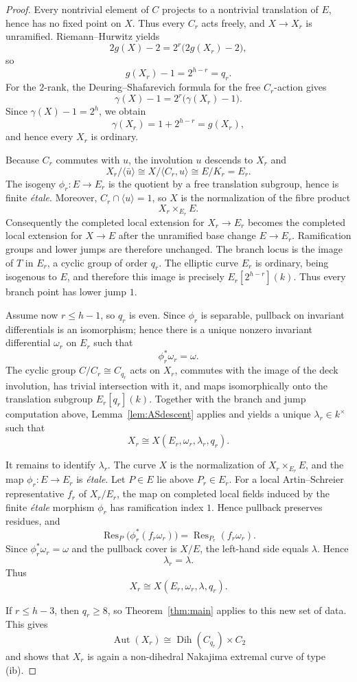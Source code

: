 \documentclass[11pt]{article}
\theoremstyle{remark}
\newcommand{\Aut}{\operatorname{Aut}}
\newcommand{\Res}{\operatorname{Res}}
\newcommand{\Dih}{\operatorname{Dih}}
\begin{document}
\begin{proof}
Every nontrivial element of $C$ projects to a nontrivial translation of
$E$, hence has no fixed point on $X$.  Thus every $C_r$ acts freely, and
$X\to X_r$ is unramified.  Riemann--Hurwitz yields
\[
 2g(X)-2=2^r\bigl(2g(X_r)-2\bigr),
\]
so
\[
 g(X_r)-1=2^{h-r}=q_r.
\]
For the $2$-rank, the Deuring--Shafarevich formula for the free
$C_r$-action gives
\[
 \gamma(X)-1=2^r\bigl(\gamma(X_r)-1\bigr).
\]
Since $\gamma(X)-1=2^h$, we obtain
\[
 \gamma(X_r)=1+2^{h-r}=g(X_r),
\]
and hence every $X_r$ is ordinary.

Because $C_r$ commutes with $u$, the involution $u$ descends to $X_r$ and
\[
 X_r/\langle\bar u\rangle
 \cong X/\langle C_r,u\rangle
 \cong E/K_r=E_r.
\]
The isogeny $\phi_r:E\to E_r$ is the quotient by a free translation
subgroup, hence is finite \emph{\'etale}.  Moreover,
$C_r\cap\langle u\rangle=1$, so $X$ is the normalization of the fibre
product
\[
 X_r\times_{E_r}E.
\]
Consequently the completed local extension for $X_r\to E_r$ becomes the
completed local extension for $X\to E$ after the unramified base change
$E\to E_r$.  Ramification groups and lower jumps are therefore unchanged.
The branch locus is the image of $T$ in $E_r$, a cyclic group of order
$q_r$.  The elliptic curve $E_r$ is ordinary, being isogenous to $E$, and
therefore this image is precisely $E_r[2^{h-r}](k)$.  Thus every branch
point has lower jump $1$.

Assume now $r\le h-1$, so $q_r$ is even.  Since $\phi_r$ is separable,
pullback on invariant differentials is an isomorphism; hence there is a
unique nonzero invariant differential $\omega_r$ on $E_r$ such that
\[
        \phi_r^*\omega_r=\omega.
\]
The cyclic group $C/C_r\cong C_{q_r}$ acts on $X_r$, commutes with the
image of the deck involution, has trivial intersection with it, and maps
isomorphically onto the translation subgroup $E_r[q_r](k)$.  Together
with the branch and jump computation above, Lemma~\ref{lem:ASdescent} applies and yields a unique $\lambda_r\in k^\times$ such that
\[
        X_r\cong X(E_r,\omega_r,\lambda_r,q_r).
\]

It remains to identify $\lambda_r$.  The curve $X$ is the normalization of
$X_r\times_{E_r}E$, and the map $\phi_r:E\to E_r$ is \emph{\'etale}.
Let $P\in E$ lie above $P_r\in E_r$.  For a local Artin--Schreier
representative $f_r$ of $X_r/E_r$, the map on completed local fields
induced by the finite \emph{\'etale} morphism $\phi_r$ has ramification
index $1$.  Hence pullback preserves residues, and
\[
 \Res_P\bigl(\phi_r^*(f_r\omega_r)\bigr)
   =\Res_{P_r}(f_r\omega_r).
\]  Since
$\phi_r^*\omega_r=\omega$ and the pullback cover is $X/E$, the left-hand
side equals $\lambda$.  Hence
\[
        \lambda_r=\lambda.
\]
Thus
\[
        X_r\cong X(E_r,\omega_r,\lambda,q_r).
\]

If $r\le h-3$, then $q_r\ge8$, so Theorem~\ref{thm:main} applies to this
new set of data.  This gives
\[
 \Aut(X_r)\cong\Dih(C_{q_r})\times C_2
\]
and shows that $X_r$ is again a non-dihedral Nakajima extremal curve of
type \textup{(ib)}.
\end{proof}
\end{document}
